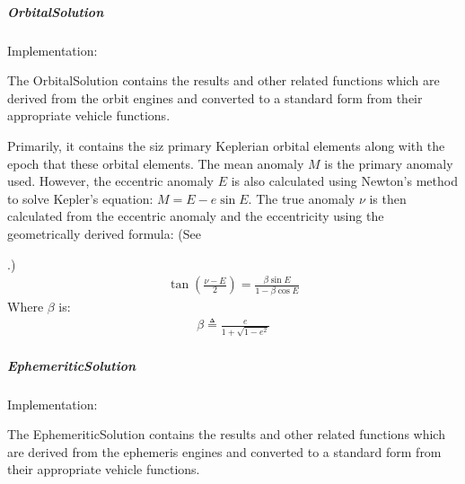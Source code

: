 \documentclass[letterpaper,11pt,english]{sphinxmanual}
\begin{document}
\subparagraph{OrbitalSolution}
\label{\detokenize{technical/architecture/vehicles_solutions:orbitalsolution}}
\sphinxAtStartPar
Implementation: {\hyperref[\detokenize{code/opihiexarata.orbit.solution:opihiexarata.orbit.solution.OrbitalSolution}]{}}

\sphinxAtStartPar
The OrbitalSolution contains the results and other related functions
which are derived from the orbit engines and converted to a standard
form from their appropriate vehicle functions.

\sphinxAtStartPar
Primarily, it contains the siz primary Keplerian orbital elements along with
the epoch that these orbital elements. The mean anomaly \(M\) is the
primary anomaly used. However, the eccentric anomaly \(E\) is also
calculated using Newton’s method to solve Kepler’s equation:
\(M = E - e \sin E\). The true anomaly \(\nu\) is then calculated
from the eccentric anomaly and the eccentricity using the geometrically
derived formula: (See
%
\begin{footnote}[51]\sphinxAtStartFootnote
{}
%
\end{footnote}.)
\begin{equation*}
\begin{split}\tan\left( \frac{\nu - E}{2} \right) = \frac{\beta \sin E}{1 - \beta \cos E}\end{split}
\end{equation*}
\sphinxAtStartPar
Where \(\beta\) is:
\begin{equation*}
\begin{split}\beta \triangleq \frac{e}{1 + \sqrt{1 - e^2}}\end{split}
\end{equation*}

\subparagraph{EphemeriticSolution}
\label{\detokenize{technical/architecture/vehicles_solutions:ephemeriticsolution}}
\sphinxAtStartPar
Implementation: {\hyperref[\detokenize{code/opihiexarata.ephemeris.solution:opihiexarata.ephemeris.solution.EphemeriticSolution}]{}}

\sphinxAtStartPar
The EphemeriticSolution contains the results and other related functions
which are derived from the ephemeris engines and converted to a standard
form from their appropriate vehicle functions.
\end{document}
